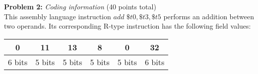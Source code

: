 \noindent \textbf{Problem 2:} \emph{Coding information} (40 points total)\\
This  assembly language instruction $add$  $\$t0,\$t3, \$t5$  performs an addition between two operands.
Its corresponding R-type instruction has the following field values: 

\begin{table}[h!]
\begin{tabular}{llllcl}
\hline
\multicolumn{1}{|c|}{0} & \multicolumn{1}{c|}{11} & \multicolumn{1}{c|}{13} & \multicolumn{1}{c|}{8} & \multicolumn{1}{c|}{0} & \multicolumn{1}{c|}{32} \\ \hline
6 bits                  & 5 bits                  & 5 bits                  & 5 bits                 & 5 bits                 & 6 bits                 
\end{tabular}
\end{table}



